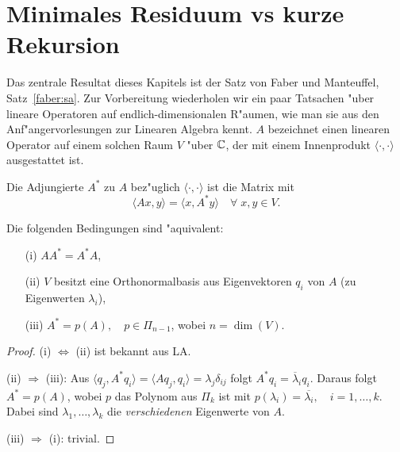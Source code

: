 %


\newcommand{\kernel}{\mbox{Kern}}
\section{Minimales Residuum vs kurze Rekursion}

Das zentrale Resultat dieses Kapitels ist der Satz von Faber und Manteuffel,
Satz~\ref{faber:sa}. Zur Vorbereitung wiederholen wir ein paar 
Tatsachen "uber lineare Operatoren auf endlich-dimensionalen R"aumen, wie man sie aus
den Anf"angervorlesungen zur Linearen Algebra kennt. $A$ bezeichnet einen 
linearen Operator auf einem solchen Raum $V$ "uber $\mathbb{C}$, der mit einem Innenprodukt
$\langle \cdot, \cdot \rangle$ ausgestattet ist.

\begin{defn} 
 Die Adjungierte $A^*$ zu $A$ bez"uglich $\langle \cdot , \cdot \rangle$ ist die Matrix mit
\[
 \langle Ax , y  \rangle = \langle x, A^*y\rangle \quad \forall \; x,y \in V.
\]
\end{defn}

\begin{lem} \label{normal_eq:lem}
Die folgenden Bedingungen sind "aquivalent:
\begin{itemize}
 \item[(i)] $AA^* =  A^*A $,
 \item[(ii)] $V$ besitzt eine Orthonormalbasis aus Eigenvektoren $q_i$ von $A$ (zu Eigenwerten $\lambda_i$),
 \item[(iii)] $A^*=p(A), \quad p \in \Pi_{n-1}$, wobei $n = \dim(V)$.
\end{itemize}
\end{lem}
\begin{proof}
 (i) $\Leftrightarrow$ (ii) ist bekannt aus LA.

 (ii) $\Longrightarrow$ (iii): Aus $\langle q_j, A^*q_i \rangle = \langle Aq_j, q_i \rangle 
  = \lambda_j \delta_{ij}$ folgt $A^*q_i = \overline{\lambda}_i q_i$.
 Daraus folgt $A^* = p(A)$, wobei $p$ das Polynom aus
$\Pi_k$ ist mit $p(\lambda_i)=\overline{\lambda_i}, \quad i=1, \dots,k$. Dabei sind  $\lambda_1,\dots,\lambda_k$ die {\em verschiedenen}
Eigenwerte von $A$.

 (iii) $\Longrightarrow$ (i): trivial.
\end{proof}
%

